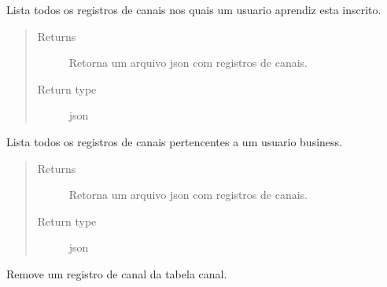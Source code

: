 \documentclass[letterpaper,10pt,english]{sphinxmanual}
\begin{document}

\begin{fulllineitems}
\label{\detokenize{index:canal.get_canais_aprendiz}}
Lista todos os registros
de canais nos quais um usuario
aprendiz esta inscrito.
\begin{quote}\begin{description}
\item[{Returns}] \leavevmode
Retorna um arquivo json com registros de canais.

\item[{Return type}] \leavevmode
json

\end{description}\end{quote}

\end{fulllineitems}


\begin{fulllineitems}
\label{\detokenize{index:canal.get_canais_business}}
Lista todos os registros
de canais pertencentes a um usuario
business.
\begin{quote}\begin{description}
\item[{Returns}] \leavevmode
Retorna um arquivo json com registros de canais.

\item[{Return type}] \leavevmode
json

\end{description}\end{quote}

\end{fulllineitems}


\begin{fulllineitems}
\label{\detokenize{index:canal.rm_canal}}
Remove um registro de canal da tabela
canal.

\end{fulllineitems}
\end{document}
